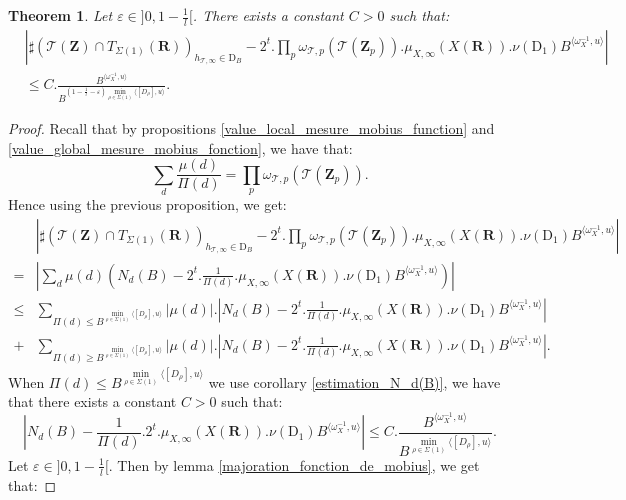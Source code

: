 \documentclass{proc-l}
\newcommand{\R}{\mathbf{R}}
\newcommand{\Z}{\mathbf{Z}}
\newcommand{\stackT}{\mathcal{T}}
\newcommand{\w}{\omega}
\newtheorem{theorem}{Theorem}[section]
\theoremstyle{definition}
\theoremstyle{remark}
\numberwithin{equation}{section}
\begin{document}
\begin{theorem}
Let $\varepsilon \in ]0,1-\frac{1}{l}[$. There exists a constant $C > 0$ such that:
\begin{align*}
    &\left| \sharp( \stackT(\Z) \cap T_{\Sigma(1)}(\R) )_{h_{\stackT,\infty} \in \mathrm{D}_B} - 2^t . \prod\limits_p \w_{\stackT,p}(\stackT(\Z_p)) . \mu_{X,\infty}(X(\R)). \nu(\mathrm{D}_1) B^{ \langle \w_{X}^{-1} , u \rangle } \right| \\
    &\leqslant C . \frac{B^{\langle \w_{X}^{-1} , u \rangle}}{B^{(1 - \frac{1}{l} - \varepsilon) \min\limits_{\rho \in \Sigma(1)} \langle [D_{\rho}] , u \rangle }}.
\end{align*}
\end{theorem}

\begin{proof}
    Recall that by propositions \ref{value_local_mesure_mobius_function} and \ref{value_global_mesure_mobius_fonction}, we have that:
    $$\sum\limits_d \frac{\mu(d)}{\Pi(d)} = \prod\limits_p \w_{\stackT,p}(\stackT(\Z_p)) .$$ Hence using the previous proposition, we get:
    \begin{align*}
        &\left| \sharp( \stackT(\Z) \cap T_{\Sigma(1)}(\R) )_{h_{\stackT,\infty} \in \mathrm{D}_B} - 2^t . \prod\limits_p \w_{\stackT,p}(\stackT(\Z_p)) . \mu_{X,\infty}(X(\R)). \nu(\mathrm{D}_1) B^{ \langle \w_{X}^{-1} , u \rangle } \right| \\
        =& \left| \sum\limits_d \mu(d) \left( N_d(B) - 2^t . \frac{1}{\Pi(d)} . \mu_{X,\infty}(X(\R)). \nu(\mathrm{D}_1) B^{ \langle \w_{X}^{-1} , u \rangle } \right) \right| \\
        \leqslant&  \sum\limits_{\Pi(d) \leqslant B^{\min\limits_{\rho \in \Sigma(1)} \langle [D_{\rho}] , u \rangle }} | \mu(d) | . \left| N_d(B) - 2^t . \frac{1}{\Pi(d)} . \mu_{X,\infty}(X(\R)). \nu(\mathrm{D}_1) B^{ \langle \w_{X}^{-1} , u \rangle } \right| \\
        +& \sum\limits_{\Pi(d) \geqslant B^{\min\limits_{\rho \in \Sigma(1)} \langle [D_{\rho}] , u \rangle }} | \mu(d) | . \left| N_d(B) - 2^t . \frac{1}{\Pi(d)} . \mu_{X,\infty}(X(\R)). \nu(\mathrm{D}_1) B^{ \langle \w_{X}^{-1} , u \rangle } \right|.
    \end{align*}
    When $\Pi(d) \leqslant B^{\min\limits_{\rho \in \Sigma(1)} \langle [D_{\rho}] , u \rangle }$ we use corollary \ref{estimation_N_d(B)}, we have that there exists a constant $C > 0$ such that:
    $$\left|  N_d(B) - \frac{1}{\Pi(d)}.2^t.\mu_{X,\infty}(X(\R)). \nu(\mathrm{D}_1) B^{ \langle \w_{X}^{-1} , u \rangle } \right| \leqslant C .\frac{B^{\langle \w_X^{-1},u\rangle}}{B^{ \min\limits_{\rho \in \Sigma(1)} \langle [D_{\rho}],u\rangle } } .$$Let $\varepsilon \in ]0,1-\frac{1}{l}[$. Then by lemma \ref{majoration_fonction_de_mobius}, we get that:

\end{proof}
\end{document}
